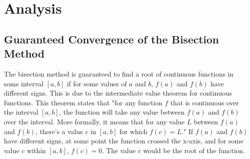 \documentclass{article}
\begin{document}
\begin{table}
\centering
{}
\caption{Estimation of negative root for $f(x)=3x^2-4x-1$, with beginning interval [0,2] and stopping criteria $0.001$.}
\label{table: 2}
\end{table}


\section{Analysis}

\subsection{Guaranteed Convergence of the Bisection Method}
The bisection method is guaranteed to find a root of continuous functions in some interval $[a,b]$ if for some values of $a$ and $b$, $f(a)$ and $f(b)$ have different signs. This is due to the intermediate value theorem for continuous functions. This theorem states that "for any function $f$ that is continuous over the interval $[a,b]$, the function will take any value between $f(a)$ and $f(b)$ over the interval. More formally, it means that for any value $L$ between $f(a)$ and $f(b)$, there's a value $c$ in $[a,b]$ for which $f(c)=L$."\cite{khan} If $f(a)$ and $f(b)$ have different signs, at some point the function crossed the x-axis, and for some value $c$ within $[a,b]$, $f(c)=0$. The value $c$ would be the root of the function.
\end{document}
